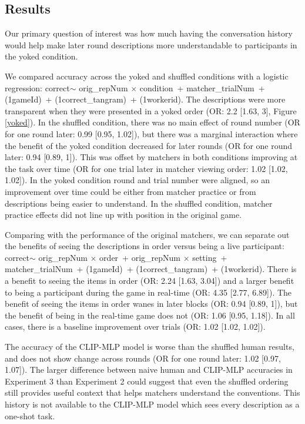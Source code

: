 \documentclass[10pt, letterpaper]{article}
\begin{document}
\subsection{Results}\label{results-1}

Our primary question of interest was how much having the conversation
history would help make later round descriptions more understandable to
participants in the yoked condition.

We compared accuracy across the yoked and shuffled conditions with a
logistic regression: correct\(\sim\) orig\_repNum \(\times\) condition~+
matcher\_trialNum~+ (1\textbar gameId)~+ (1\textbar correct\_tangram)~+
(1\textbar workerid). The descriptions were more transparent when they
were presented in a yoked order (OR: 2.2 {[}1.63, 3{]}, Figure
\ref{yoked}). In the shuffled condition, there was no main effect of
round number (OR for one round later: 0.99 {[}0.95, 1.02{]}), but there
was a marginal interaction where the benefit of the yoked condition
decreased for later rounds (OR for one round later: 0.94 {[}0.89, 1{]}).
This was offset by matchers in both conditions improving at the task
over time (OR for one trial later in matcher viewing order: 1.02
{[}1.02, 1.02{]}). In the yoked condition round and trial number were
aligned, so an improvement over time could be either from matcher
practice or from descriptions being easier to understand. In the
shuffled condition, matcher practice effects did not line up with
position in the original game.

Comparing with the performance of the original matchers, we can separate
out the benefits of seeing the descriptions in order versus being a live
participant: correct\(\sim\) orig\_repNum \(\times\) order~+
orig\_repNum \(\times\) setting~+ matcher\_trialNum~+
(1\textbar gameId)~+ (1\textbar correct\_tangram)~+
(1\textbar workerid). There is a benefit to seeing the items in order
(OR: 2.24 {[}1.63, 3.04{]}) and a larger benefit to being a participant
during the game in real-time (OR: 4.35 {[}2.77, 6.89{]}). The benefit of
seeing the items in order wanes in later blocks (OR: 0.94 {[}0.89,
1{]}), but the benefit of being in the real-time game does not (OR: 1.06
{[}0.95, 1.18{]}). In all cases, there is a baseline improvement over
trials (OR: 1.02 {[}1.02, 1.02{]}).

The accuracy of the CLIP-MLP model is worse than the shuffled human
results, and does not show change across rounds (OR for one round later:
1.02 {[}0.97, 1.07{]}). The larger difference between naive human and
CLIP-MLP accuracies in Experiment 3 than Experiment 2 could suggest that
even the shuffled ordering still provides useful context that helps
matchers understand the conventions. This history is not available to
the CLIP-MLP model which sees every description as a one-shot task.
\end{document}
